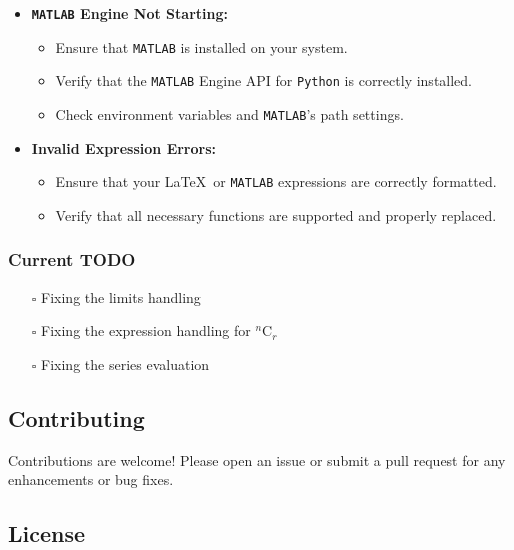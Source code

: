 \documentclass{article}
\begin{document}
\begin{itemize}
\item
  \textbf{\texttt{MATLAB} Engine Not Starting:}

  \begin{itemize}
  \item
    Ensure that \texttt{MATLAB} is installed on your system.
  \item
    Verify that the \texttt{MATLAB} Engine API for \texttt{Python} is correctly installed.
  \item
    Check environment variables and \texttt{MATLAB}'s path settings.
  \end{itemize}
\item
  \textbf{Invalid Expression Errors:}

  \begin{itemize}
  \item Ensure that your \LaTeX \, or \texttt{MATLAB} expressions are correctly formatted.
  \item Verify that all necessary functions are supported and properly replaced.
  \end{itemize}
\end{itemize}


\subsubsection{Current TODO}

\begin{itemize}
    \item[$\square$] Fixing the limits handling
    \item[$\square$] Fixing the expression handling for \(^n\text{C}_r\)
    \item[$\square$] Fixing the series evaluation
\end{itemize}

\hfill

\subsection{Contributing}

Contributions are welcome! Please open an issue or submit a pull request
for any enhancements or bug fixes.

\hfill

\subsection{License}
\end{document}
